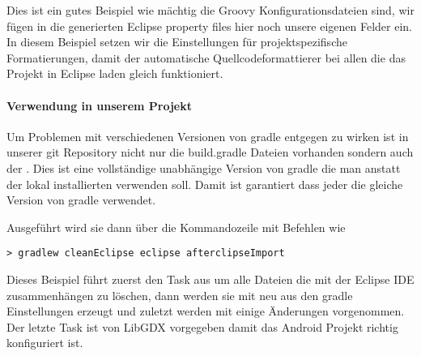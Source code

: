 Dies ist ein gutes Beispiel wie mächtig die Groovy Konfigurationsdateien sind, wir fügen in die generierten Eclipse property files hier noch unsere eigenen Felder ein.
In diesem Beispiel setzen wir die Einstellungen für projektspezifische Formatierungen, damit der automatische Quellcodeformattierer bei allen die das Projekt in Eclipse laden gleich funktioniert.

\paragraph{Verwendung in unserem Projekt}

Um Problemen mit verschiedenen Versionen von gradle entgegen zu wirken ist in unserer git Repository nicht nur die build.gradle Dateien vorhanden sondern auch der . Dies ist eine vollständige unabhängige Version von gradle die man anstatt der lokal installierten verwenden soll. Damit ist garantiert dass jeder die gleiche Version von gradle verwendet.

Ausgeführt wird sie dann über die Kommandozeile mit Befehlen wie

\begin{lstlisting}[caption=Gradle in der Kommandozeile, title=\hspace{0 pt}, style=cmd]
> gradlew cleanEclipse eclipse afterclipseImport
\end{lstlisting}

Dieses Beispiel führt zuerst den Task  aus um alle Dateien die mit der Eclipse IDE zusammenhängen zu löschen, dann werden sie mit  neu aus den gradle Einstellungen erzeugt und zuletzt werden mit  einige Änderungen vorgenommen. Der letzte Task ist von LibGDX vorgegeben damit das Android Projekt richtig konfiguriert ist.
